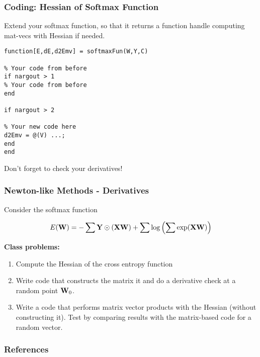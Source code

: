 \documentclass[12pt,fleqn,handout]{beamer}
\begin{document}
\begin{frame}[fragile]\frametitle{Coding: Hessian of Softmax Function}

Extend your softmax function, so that it returns a function handle computing mat-vecs with Hessian if needed.

\begin{verbatim}
function[E,dE,d2Emv] = softmaxFun(W,Y,C)

% Your code from before
if nargout > 1
% Your code from before
end

if nargout > 2

% Your new code here
d2Emv = @(V) ...;
end
end
\end{verbatim}
\begin{center}
	Don't forget to check your derivatives!
\end{center}
\end{frame}


\begin{frame}\frametitle{Newton-like Methods - Derivatives}

Consider the softmax function

$$ E({\bf W}) = -\sum {\bf Y} \odot ({\bf X} {\bf W}) +\sum \log\left (\sum \exp({\bf X} {\bf W}) \right) $$


{\bf Class problems:}

\begin{enumerate}
\item Compute the Hessian of the cross entropy function

\item Write code that constructs the matrix it and do a derivative check at a random point ${\bf W}_0$.

\item
Write a code that performs matrix vector products with the Hessian (without constructing it). Test by comparing results with the matrix-based code for a random vector.

\end{enumerate}


\end{frame}

\begin{frame}[allowframebreaks]
	\frametitle{References}



\end{frame}
\end{document}
